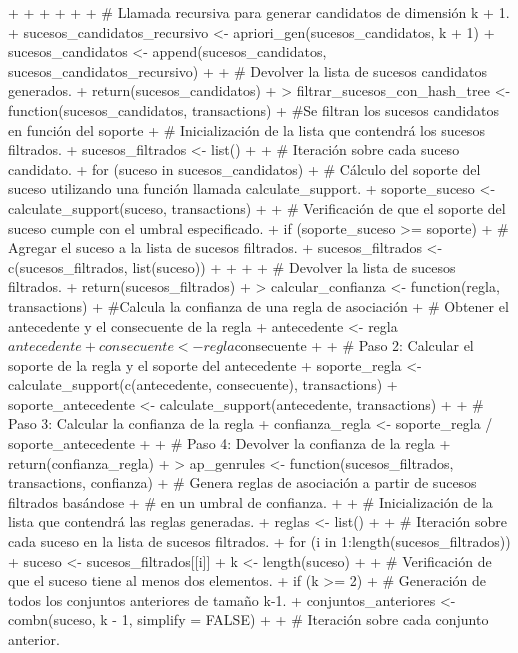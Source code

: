 \documentclass[a4paper, 12pt]{article}
\begin{document}
\begin{Schunk}
\begin{Sinput}
{{{{{+ 	    }
+ 	  }
+     }
+   }
+ 
+   # Llamada recursiva para generar candidatos de dimensión k + 1.
+   sucesos_candidatos_recursivo <- apriori_gen(sucesos_candidatos, k + 1)
+   sucesos_candidatos <- append(sucesos_candidatos, sucesos_candidatos_recursivo)
+ 
+   # Devolver la lista de sucesos candidatos generados.
+   return(sucesos_candidatos)
+ }
> filtrar_sucesos_con_hash_tree <- function(sucesos_candidatos, transactions) {
+   #Se filtran los sucesos candidatos en función del soporte
+   # Inicialización de la lista que contendrá los sucesos filtrados.
+   sucesos_filtrados <- list()
+ 
+   # Iteración sobre cada suceso candidato.
+   for (suceso in sucesos_candidatos) {
+     # Cálculo del soporte del suceso utilizando una función llamada calculate_support.
+     soporte_suceso <- calculate_support(suceso, transactions)
+     
+     # Verificación de que el soporte del suceso cumple con el umbral especificado.
+     if (soporte_suceso >= soporte) {
+       # Agregar el suceso a la lista de sucesos filtrados.
+       sucesos_filtrados <- c(sucesos_filtrados, list(suceso))
+     }
+   }
+ 
+   # Devolver la lista de sucesos filtrados.
+   return(sucesos_filtrados)
+ }
> calcular_confianza <- function(regla, transactions) {
+   #Calcula la confianza de una regla de asociación
+   # Obtener el antecedente y el consecuente de la regla
+   antecedente <- regla$antecedente
+   consecuente <- regla$consecuente
+ 
+   # Paso 2: Calcular el soporte de la regla y el soporte del antecedente
+   soporte_regla <- calculate_support(c(antecedente, consecuente), transactions)
+   soporte_antecedente <- calculate_support(antecedente, transactions)
+ 
+   # Paso 3: Calcular la confianza de la regla
+   confianza_regla <- soporte_regla / soporte_antecedente
+ 
+   # Paso 4: Devolver la confianza de la regla
+   return(confianza_regla)
+ }
> ap_genrules <- function(sucesos_filtrados, transactions, confianza) {
+   # Genera reglas de asociación a partir de sucesos filtrados basándose
+   # en un umbral de confianza.
+ 
+   # Inicialización de la lista que contendrá las reglas generadas.
+   reglas <- list()
+   
+   # Iteración sobre cada suceso en la lista de sucesos filtrados.
+   for (i in 1:length(sucesos_filtrados)) {
+     suceso <- sucesos_filtrados[[i]]
+     k <- length(suceso)
+     
+     # Verificación de que el suceso tiene al menos dos elementos.
+     if (k >= 2) {
+       # Generación de todos los conjuntos anteriores de tamaño k-1.
+       conjuntos_anteriores <- combn(suceso, k - 1, simplify = FALSE)
+       
+       # Iteración sobre cada conjunto anterior.
}}}
\end{Sinput}
\end{Schunk}
\end{document}
